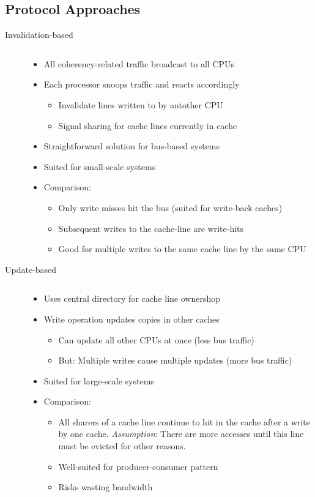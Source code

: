 \subsection{Protocol Approaches}
\begin{description}
	\item[Invalidation-based] $\text{}$
		\begin{itemize}
			\item All coherency-related traffic broadcast to all CPUs
			\item Each processor snoops traffic and reacts accordingly
				\begin{itemize}
					\item Invalidate lines written to by antother CPU
					\item Signal sharing for cache lines currently in cache
				\end{itemize}
			\item Straightforward solution for bus-based systems
			\item Suited for small-scale systems
			\item Comparison:
				\begin{itemize}
					\item Only write misses hit the bus (suited for write-back caches)
					\item Subsequent writes to the cache-line are write-hits
					\item Good for multiple writes to the same cache line by the same CPU
				\end{itemize}

		\end{itemize}
	\item[Update-based] $\text{}$
		\begin{itemize}
			\item Uses central directory for cache line ownershop
			\item Write operation updates copies in other caches
				\begin{itemize}
					\item Can update all other CPUs at once (less bus traffic)
					\item But: Multiple writes cause multiple updates (more bus traffic)
				\end{itemize}
			\item Suited for large-scale systems
			\item Comparison:
				\begin{itemize}
					\item All sharers of a cache line continue to hit in the cache after a write by one cache.
						\emph{Assumption}: There are more accesses until this line must be evicted for other reasons.
					\item Well-suited for producer-consumer pattern
					\item Risks wasting bandwidth
				\end{itemize}

		\end{itemize}
\end{description}

